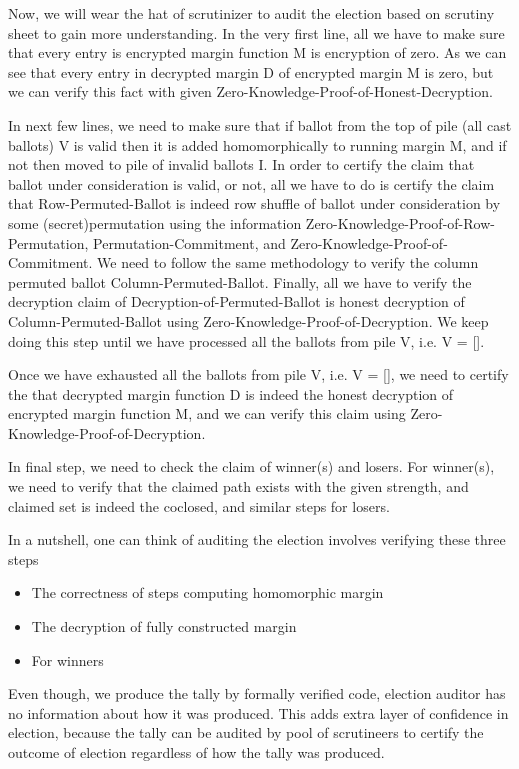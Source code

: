 \documentclass{llncs}
\begin{document}
Now, we will wear the hat of scrutinizer to audit the election based on 
 scrutiny sheet to gain more understanding. In the very first line, all we 
 have to make sure that every entry is encrypted margin function M is encryption 
 of zero. As we can see that every entry in decrypted margin D 
 of encrypted margin M is zero, but we can verify this fact with 
 given Zero-Knowledge-Proof-of-Honest-Decryption.
 
 In next few lines, we need to make sure that if ballot from the top of 
 pile (all cast ballots) V is valid then it is added homomorphically to 
 running margin M, 
 and if not then moved to pile of invalid ballots I. In 
 order to certify the claim that ballot under consideration is valid, 
 or not, all we have to do is certify the claim that Row-Permuted-Ballot 
 is indeed row shuffle of ballot under consideration by 
 some (secret)permutation using the information  
 Zero-Knowledge-Proof-of-Row-Permutation, Permutation-Commitment, and 
 Zero-Knowledge-Proof-of-Commitment. We need to follow the same methodology 
 to verify the column permuted ballot Column-Permuted-Ballot. Finally, 
 all we have to verify the decryption claim of Decryption-of-Permuted-Ballot
 is honest decryption of Column-Permuted-Ballot using 
 Zero-Knowledge-Proof-of-Decryption. We keep doing this step until we have 
 processed all the ballots from pile V, i.e. V = []. 
 
 Once we have exhausted all the ballots from pile V, i.e. V = [], we 
 need to certify the that decrypted margin function D is indeed the 
 honest decryption of encrypted margin function M, and we can 
 verify this claim using Zero-Knowledge-Proof-of-Decryption.
 
 In final step, we need to check the claim of winner(s) and losers. 
 For winner(s), we need to verify that the claimed path exists with 
 the given strength, and claimed set is indeed the coclosed, and similar
 steps for losers.

In a nutshell, one can 
think of auditing the election involves verifying these three steps
\begin{itemize}
 \item The correctness of steps computing homomorphic margin 
 \item The decryption of fully constructed margin
 \item For winners 
\end{itemize} 

Even though, we produce the tally by formally verified code, election 
auditor has no information about how it was produced. This adds extra layer
of confidence in election, because the tally can be audited by pool
of scrutineers to certify the outcome of election regardless of how the tally 
was produced.
\end{document}
